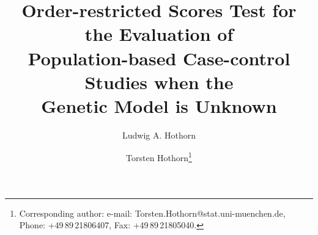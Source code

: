\documentclass[bimj,fleqn]{w-art}
\begin{document}
\newcommand{\url}[1]{\texttt{#1}}




\title[Order-restricted Scores Test]{Order-restricted Scores Test for the Evaluation of \\
       Population-based Case-control Studies when the \\
       Genetic Model is Unknown}

\author[Ludwig A. Hothorn]{Ludwig A. Hothorn }
\address[\inst{1}]{Institut f\"ur Biostatistik, Leibniz-Universit\"at Hannover \\
Herrenh\"auser Stra{\ss}e 2, D--30419 Hannover, Germany}

\author[Torsten Hothorn]{Torsten Hothorn\footnote{Corresponding
     author: e-mail: {\sf Torsten.Hothorn@stat.uni-muenchen.de}, Phone: +49\,89\,21806407,
     Fax: +49\,89\,21805040.} } 
\address[\inst{2}]{
Institut f{\"u}r Statistik \\ Ludwig-Maximilians-Universit{\"a}t M{\"u}nchen \\
Ludwigstra{\ss }e 33, D--80539 M{\"u}nchen, Germany}
\end{document}
